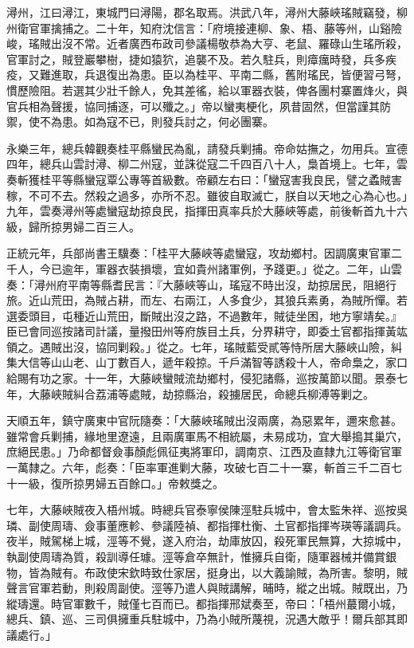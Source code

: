 \begin{pinyinscope}
潯州，江曰潯江，東城門曰潯陽，郡名取焉。洪武八年，潯州大藤峽瑤賊竊發，柳州衛官軍擒捕之。二十年，知府沈信言：「府境接連柳、象、梧、藤等州，山谿險峻，瑤賊出沒不常。近者廣西布政司參議楊敬恭為大亨、老鼠、羅碌山生瑤所殺，官軍討之，賊登巖攀樹，捷如猿狖，追襲不及。若久駐兵，則瘴癘時發，兵多疾疫，又難進取，兵退復出為患。臣以為桂平、平南二縣，舊附瑤民，皆便習弓弩，慣歷險阻。若選其少壯千餘人，免其差徭，給以軍器衣裝，俾各團村寨置烽火，與官兵相為聲援，協同捕逐，可以殲之。」帝以蠻夷梗化，夙昔固然，但當謹其防禦，使不為患。如為寇不已，則發兵討之，何必團寨。

永樂三年，總兵韓觀奏桂平縣蠻民為亂，請發兵剿捕。帝命姑撫之，勿用兵。宣德四年，總兵山雲討潯、柳二州寇，並誅從寇二千四百八十人，梟首境上。七年，雲奏斬獲桂平等縣蠻寇覃公專等首級數。帝顧左右曰：「蠻寇害我良民，譬之蟊賊害稼，不可不去。然殺之過多，亦所不忍。雖彼自取滅亡，朕自以天地之心為心也。」九年，雲奏潯州等處蠻寇劫掠良民，指揮田真率兵於大藤峽等處，前後斬首九十六級，歸所掠男婦二百三人。

正統元年，兵部尚書王驥奏：「桂平大藤峽等處蠻寇，攻劫鄉村。因調廣東官軍二千人，今已逾年，軍器衣裝損壞，宜如貴州諸軍例，予踐更。」從之。二年，山雲奏：「潯州府平南等縣耆民言：『大藤峽等山，瑤寇不時出沒，劫掠居民，阻絕行旅。近山荒田，為賊占耕，而左、右兩江，人多食少，其狼兵素勇，為賊所憚。若選委頭目，屯種近山荒田，斷賊出沒之路，不過數年，賊徒坐困，地方寧靖矣。』臣已會同巡按諸司計議，量撥田州等府族目土兵，分界耕守，即委土官都指揮黃竑領之。遇賊出沒，協同剿殺。」從之。七年，瑤賊藍受貳等恃所居大藤峽山險，糾集大信等山山老、山丁數百人，遞年殺掠。千戶滿智等誘殺十人，帝命梟之，家口給賜有功之家。十一年，大藤峽蠻賊流劫鄉村，侵犯諸縣，巡按萬節以聞。景泰七年，大藤峽賊糾合荔浦等處賊，劫掠縣治，殺擄居民，命總兵柳溥等剿之。

天順五年，鎮守廣東中官阮隨奏：「大藤峽瑤賊出沒兩廣，為惡累年，邇來愈甚。雖常會兵剿捕，緣地里遼遠，且兩廣軍馬不相統屬，未易成功，宜大舉搗其巢穴，庶絕民患。」乃命都督僉事顏彪佩征夷將軍印，調南京、江西及直隸九江等衛官軍一萬隸之。六年，彪奏：「臣率軍進剿大藤，攻破七百二十一寨，斬首三千二百七十一級，復所掠男婦五百餘口。」帝敕獎之。

七年，大藤峽賊夜入梧州城。時總兵官泰寧侯陳涇駐兵城中，會太監朱祥、巡按吳璘、副使周璹、僉事董應軫、參議陸禎、都指揮杜衡、土官都指揮岑瑛等議調兵。夜半，賊駕梯上城，涇等不覺，遂入府治，劫庫放囚，殺死軍民無算，大掠城中，執副使周璹為質，殺訓導任璩。涇等倉卒無計，惟擁兵自衛，隨軍器械并備賞銀物，皆為賊有。布政使宋欽時致仕家居，挺身出，以大義諭賊，為所害。黎明，賊聲言官軍若動，則殺周副使。涇等乃遣人與賊講解，晡時，縱之出城。賊既出，乃縱璹還。時官軍數千，賊僅七百而已。都指揮邢斌奏至，帝曰：「梧州蕞爾小城，總兵、鎮、巡、三司俱擁重兵駐城中，乃為小賊所蔑視，況遇大敵乎！爾兵部其即議處行。」


\end{pinyinscope}
